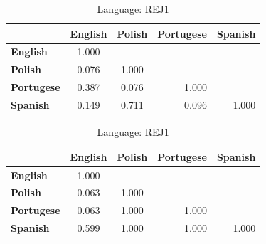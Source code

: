 \begin{table}
    \small
    \centering
    \begin{tabular}{lcccc}
        \toprule
                           & \multicolumn{1}{l}{\textbf{English}} & \multicolumn{1}{l}{\textbf{Polish}} & \textbf{Portugese}        & \textbf{Spanish}          \\
        \midrule
        \textbf{English}   & 1.000                                & \multicolumn{1}{l}{}                &                           &                           \\
        \textbf{Polish}    & 0.076                                & 1.000                               &                           &                           \\
        \textbf{Portugese} & 0.387                                & 0.076                               & \multicolumn{1}{r}{1.000} &                           \\
        \textbf{Spanish}   & 0.149                                & 0.711                               & \multicolumn{1}{r}{0.096} & \multicolumn{1}{r}{1.000} \\
        \bottomrule
    \end{tabular}
    \caption{Language: REJ1}
\end{table}

\begin{table}
    \small
    \centering
    \begin{tabular}{lcccc}
        \toprule
                           & \multicolumn{1}{l}{\textbf{English}} & \multicolumn{1}{l}{\textbf{Polish}} & \textbf{Portugese}        & \textbf{Spanish}          \\
        \midrule
        \textbf{English}   & 1.000                                & \multicolumn{1}{l}{}                &                           &                           \\
        \textbf{Polish}    & 0.063                                & 1.000                               &                           &                           \\
        \textbf{Portugese} & 0.063                                & 1.000                               & \multicolumn{1}{r}{1.000} &                           \\
        \textbf{Spanish}   & 0.599                                & 1.000                               & \multicolumn{1}{r}{1.000} & \multicolumn{1}{r}{1.000} \\
        \bottomrule
    \end{tabular}
    \caption{Language: REJ1}
\end{table}

